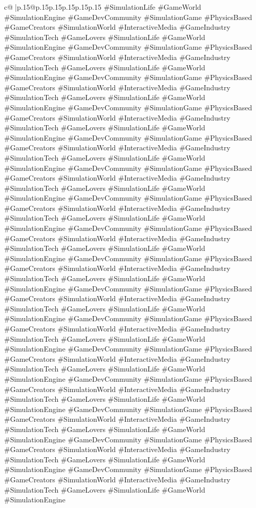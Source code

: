 \documentclass{article}
\begin{document}
{\begin{supertabular}{c@{$\;$}|p{.15\linewidth}@{}p{.15\linewidth}p{.15\linewidth}p{.15\linewidth}p{.15\linewidth}p{.15\linewidth}}
{{{\#SimulationLife \#GameWorld \#SimulationEngine \#GameDevCommunity \#SimulationGame \#PhysicsBased \#GameCreators \#SimulationWorld \#InteractiveMedia \#GameIndustry \#SimulationTech \#GameLovers \#SimulationLife \#GameWorld \#SimulationEngine \#GameDevCommunity \#SimulationGame \#PhysicsBased \#GameCreators \#SimulationWorld \#InteractiveMedia \#GameIndustry \#SimulationTech \#GameLovers \#SimulationLife \#GameWorld \#SimulationEngine \#GameDevCommunity \#SimulationGame \#PhysicsBased \#GameCreators \#SimulationWorld \#InteractiveMedia \#GameIndustry \#SimulationTech \#GameLovers \#SimulationLife \#GameWorld \#SimulationEngine \#GameDevCommunity \#SimulationGame \#PhysicsBased \#GameCreators \#SimulationWorld \#InteractiveMedia \#GameIndustry \#SimulationTech \#GameLovers \#SimulationLife \#GameWorld \#SimulationEngine \#GameDevCommunity \#SimulationGame \#PhysicsBased \#GameCreators \#SimulationWorld \#InteractiveMedia \#GameIndustry \#SimulationTech \#GameLovers \#SimulationLife \#GameWorld \#SimulationEngine \#GameDevCommunity \#SimulationGame \#PhysicsBased \#GameCreators \#SimulationWorld \#InteractiveMedia \#GameIndustry \#SimulationTech \#GameLovers \#SimulationLife \#GameWorld \#SimulationEngine \#GameDevCommunity \#SimulationGame \#PhysicsBased \#GameCreators \#SimulationWorld \#InteractiveMedia \#GameIndustry \#SimulationTech \#GameLovers \#SimulationLife \#GameWorld \#SimulationEngine \#GameDevCommunity \#SimulationGame \#PhysicsBased \#GameCreators \#SimulationWorld \#InteractiveMedia \#GameIndustry \#SimulationTech \#GameLovers \#SimulationLife \#GameWorld \#SimulationEngine \#GameDevCommunity \#SimulationGame \#PhysicsBased \#GameCreators \#SimulationWorld \#InteractiveMedia \#GameIndustry \#SimulationTech \#GameLovers \#SimulationLife \#GameWorld \#SimulationEngine \#GameDevCommunity \#SimulationGame \#PhysicsBased \#GameCreators \#SimulationWorld \#InteractiveMedia \#GameIndustry \#SimulationTech \#GameLovers \#SimulationLife \#GameWorld \#SimulationEngine \#GameDevCommunity \#SimulationGame \#PhysicsBased \#GameCreators \#SimulationWorld \#InteractiveMedia \#GameIndustry \#SimulationTech \#GameLovers \#SimulationLife \#GameWorld \#SimulationEngine \#GameDevCommunity \#SimulationGame \#PhysicsBased \#GameCreators \#SimulationWorld \#InteractiveMedia \#GameIndustry \#SimulationTech \#GameLovers \#SimulationLife \#GameWorld \#SimulationEngine \#GameDevCommunity \#SimulationGame \#PhysicsBased \#GameCreators \#SimulationWorld \#InteractiveMedia \#GameIndustry \#SimulationTech \#GameLovers \#SimulationLife \#GameWorld \#SimulationEngine \#GameDevCommunity \#SimulationGame \#PhysicsBased \#GameCreators \#SimulationWorld \#InteractiveMedia \#GameIndustry \#SimulationTech \#GameLovers \#SimulationLife \#GameWorld \#SimulationEngine \#GameDevCommunity \#SimulationGame \#PhysicsBased \#GameCreators \#SimulationWorld \#InteractiveMedia \#GameIndustry \#SimulationTech \#GameLovers \#SimulationLife \#GameWorld \#SimulationEngine \#GameDevCommunity \#SimulationGame \#PhysicsBased \#GameCreators \#SimulationWorld \#InteractiveMedia \#GameIndustry \#SimulationTech \#GameLovers \#SimulationLife \#GameWorld \#SimulationEngine }}}
\end{supertabular}}
\end{document}
